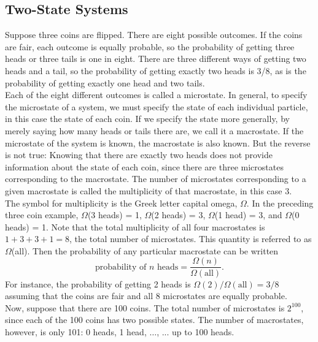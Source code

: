 \documentclass[11pt]{exam}
\begin{document}
\subsection{Two-State Systems}
Suppose three coins are flipped. There are eight possible outcomes. If the coins are fair, each outcome is equally probable, so the probability of getting three heads or three tails is one in eight. There are three different ways of getting two heads and a tail, so the probability of getting exactly two heads is 3/8, as is the probability of getting exactly one head and two tails.\\
\hspace*{10mm}Each of the eight different outcomes is called a microstate. In general, to specify the microstate of a system, we must specify the state of each individual particle, in this case the state of each coin. If we specify the state more generally, by merely saying how many heads or tails there are, we call it a macrostate. If the microstate of the system is known, the macrostate is also known. But the reverse is not true: Knowing that there are exactly two heads does not provide information about the state of each coin, since there are three microstates corresponding to the macrostate. The number of microstates corresponding to a given macrostate is called the multiplicity of that macrostate, in this case 3.\\
\hspace*{10mm}The symbol for multiplicity is the Greek letter capital omega, $\Omega$. In the preceding three coin example, $\Omega$(3 heads) = 1,  $\Omega$(2 heads) = 3, $\Omega$(1 head) = 3, and $\Omega$(0 heads) = 1. Note that the total multiplicity of all four macrostates is $1+3+3+1=8$, the total number of microstates. This quantity is referred to as $\Omega$(all). Then the probability of any particular macrostate can be written
\begin{equation}\tag{2.1}
\text{probability of $n$ heads} = \frac{\Omega(n)}{\Omega(\text{all})}.
\end{equation}
For instance, the probability of getting 2 heads is $\Omega(2)/\Omega(\text{all})=3/8$ assuming that the coins are fair and all 8 microstates are equally probable.\\
\hspace*{10mm}Now, suppose that there are 100 coins. The total number of microstates is $2^100$, since each of the 100 coins has two possible states. The number of macrostates, however, is only 101: 0 heads, 1 head, $\dots$, ... up to 100 heads. \\
\end{document}
